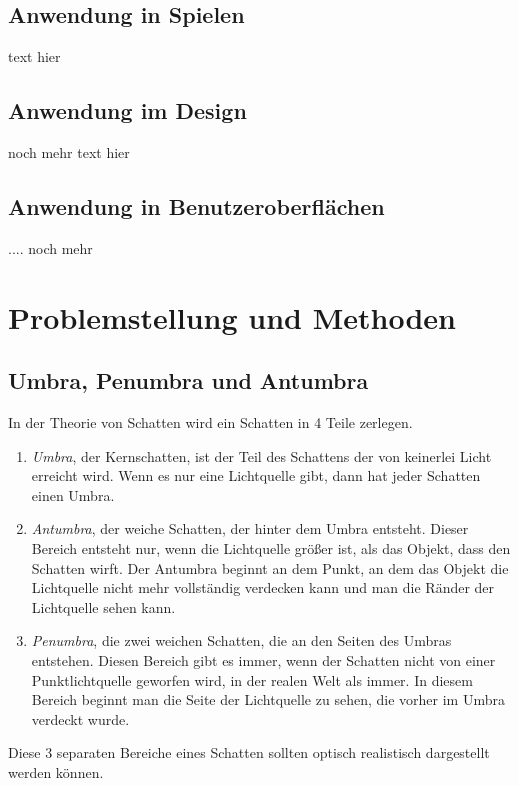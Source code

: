 \documentclass[10pt,twocolumn]{scrartcl}
\begin{document}
\subsection{Anwendung in Spielen}

text hier 

\subsection{Anwendung im Design}

noch mehr text hier

\subsection{Anwendung in Benutzeroberflächen}

.... noch mehr

\section{Problemstellung und Methoden}

\subsection{Umbra, Penumbra und Antumbra}

In der Theorie von Schatten wird ein Schatten in 4 Teile zerlegen.
\begin{enumerate}
 \item \emph{Umbra}, der Kernschatten, ist der Teil des Schattens der von keinerlei Licht erreicht wird.
       Wenn es nur eine Lichtquelle gibt, dann hat jeder Schatten einen Umbra.
 \item \emph{Antumbra}, der weiche Schatten, der hinter dem Umbra entsteht. Dieser Bereich entsteht nur,
       wenn die Lichtquelle größer ist, als das Objekt, dass den Schatten wirft. Der Antumbra beginnt an
       dem Punkt, an dem das Objekt die Lichtquelle nicht mehr vollständig verdecken kann und man die
       Ränder der Lichtquelle sehen kann.
 \item \emph{Penumbra}, die zwei weichen Schatten, die an den Seiten des Umbras entstehen. Diesen Bereich
       gibt es immer, wenn der Schatten nicht von einer Punktlichtquelle geworfen wird, in der realen
       Welt als immer. In diesem Bereich beginnt man die Seite der Lichtquelle zu sehen, die vorher im
       Umbra verdeckt wurde.
\end{enumerate}

Diese 3 separaten Bereiche eines Schatten sollten optisch realistisch dargestellt werden können.
\end{document}
